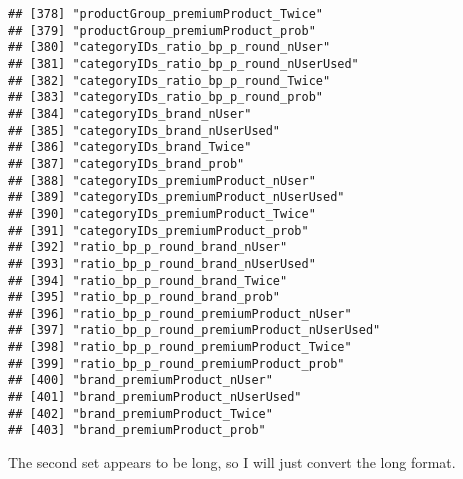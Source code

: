 \documentclass[10pt]{report}
\newenvironment{Shaded}{}{}
\newcommand{\KeywordTok}[1]{\textcolor[rgb]{0.00,0.44,0.13}{\textbf{{#1}}}}
\newcommand{\DataTypeTok}[1]{\textcolor[rgb]{0.56,0.13,0.00}{{#1}}}
\newcommand{\DecValTok}[1]{\textcolor[rgb]{0.25,0.63,0.44}{{#1}}}
\newcommand{\StringTok}[1]{\textcolor[rgb]{0.25,0.44,0.63}{{#1}}}
\newcommand{\NormalTok}[1]{{#1}}
\begin{document}
\begin{verbatim}
## [378] "productGroup_premiumProduct_Twice"                  
## [379] "productGroup_premiumProduct_prob"                   
## [380] "categoryIDs_ratio_bp_p_round_nUser"                 
## [381] "categoryIDs_ratio_bp_p_round_nUserUsed"             
## [382] "categoryIDs_ratio_bp_p_round_Twice"                 
## [383] "categoryIDs_ratio_bp_p_round_prob"                  
## [384] "categoryIDs_brand_nUser"                            
## [385] "categoryIDs_brand_nUserUsed"                        
## [386] "categoryIDs_brand_Twice"                            
## [387] "categoryIDs_brand_prob"                             
## [388] "categoryIDs_premiumProduct_nUser"                   
## [389] "categoryIDs_premiumProduct_nUserUsed"               
## [390] "categoryIDs_premiumProduct_Twice"                   
## [391] "categoryIDs_premiumProduct_prob"                    
## [392] "ratio_bp_p_round_brand_nUser"                       
## [393] "ratio_bp_p_round_brand_nUserUsed"                   
## [394] "ratio_bp_p_round_brand_Twice"                       
## [395] "ratio_bp_p_round_brand_prob"                        
## [396] "ratio_bp_p_round_premiumProduct_nUser"              
## [397] "ratio_bp_p_round_premiumProduct_nUserUsed"          
## [398] "ratio_bp_p_round_premiumProduct_Twice"              
## [399] "ratio_bp_p_round_premiumProduct_prob"               
## [400] "brand_premiumProduct_nUser"                         
## [401] "brand_premiumProduct_nUserUsed"                     
## [402] "brand_premiumProduct_Twice"                         
## [403] "brand_premiumProduct_prob"
\end{verbatim}

The second set appears to be long, so I will just convert the long
format.

\begin{Shaded}
\end{Shaded}
\end{document}
